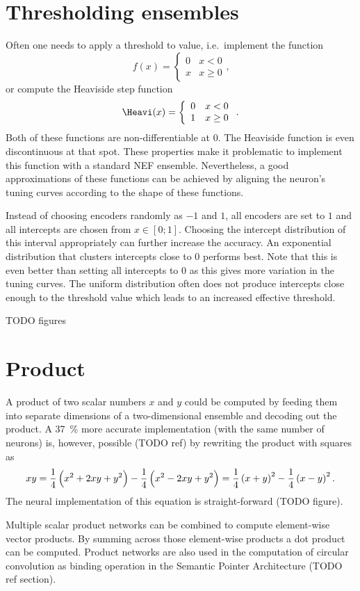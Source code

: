 \section{Thresholding ensembles}
Often one needs to apply a threshold to value, i.e.\ implement the function
\begin{equation}
    f(x) = \left\{ \begin{array}{ll}
            0 & x < 0 \\
            x & x \geq 0
        \end{array} \right.
    \text{,}
\end{equation}
or compute the Heaviside step function
\begin{equation}
    \Heavi(x) = \left\{ \begin{array}{ll}
            0 & x < 0 \\
            1 & x \geq 0
        \end{array} \right.
    \text{.}
\end{equation}
Both of these functions are non-differentiable at 0.
The Heaviside function is even discontinuous at that spot.
These properties make it problematic to implement this function with a standard NEF ensemble.
Nevertheless, a good approximations of these functions can be achieved by aligning the neuron's tuning curves according to the shape of these functions.

Instead of choosing encoders randomly as $-1$ and $1$, all encoders are set to $1$ and all intercepts are chosen from $x \in [0; 1]$.
Choosing the intercept distribution of this interval appropriately can further increase the accuracy.
An exponential distribution that clusters intercepts close to 0 performs best.
Note that this is even better than setting all intercepts to 0 as this gives more variation in the tuning curves.
The uniform distribution often does not produce intercepts close enough to the threshold value which leads to an increased effective threshold.

TODO figures

\section{Product}
A product of two scalar numbers $x$ and $y$ could be computed by feeding them into separate dimensions of a two-dimensional ensemble and decoding out the product.
A \SI{37}{\percent} more accurate implementation (with the same number of neurons) is, however, possible (TODO ref) by rewriting the product with squares as
\begin{equation}
    xy = \frac{1}{4}\del{x^2 + 2xy + y^2} - \frac{1}{4}\del{x^2 - 2xy + y^2} = \frac{1}{4}\del{x + y}^2 - \frac{1}{4}\del{x - y}^2 \text{.}
\end{equation}
The neural implementation of this equation is straight-forward (TODO figure).

Multiple scalar product networks can be combined to compute element-wise vector products.
By summing across those element-wise products a dot product can be computed.
Product networks are also used in the computation of circular convolution as binding operation in the Semantic Pointer Architecture (TODO ref section).
